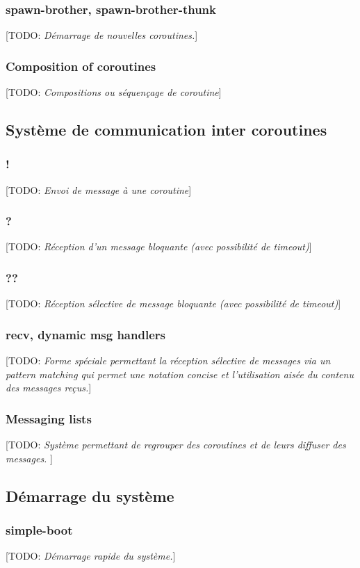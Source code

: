 \documentclass[12pt,oneside,letterpaper,francais]{book}
\newcommand{\todo}[1]{[TODO: {\it #1}]}
\begin{document}
\subsubsection{spawn-brother, spawn-brother-thunk}
\todo{Démarrage de nouvelles coroutines.}

\subsubsection{Composition of coroutines}
\todo{Compositions ou séquençage de coroutine}

\subsection{Système de communication inter coroutines}
\subsubsection{!} 
\todo{Envoi de message à une coroutine}

\subsubsection{?}
\todo{Réception d'un message bloquante (avec possibilité de timeout)}

\subsubsection{??}
\todo{Réception sélective de message bloquante (avec possibilité de timeout)}

\subsubsection{recv, dynamic msg handlers}
\todo{Forme spéciale permettant la réception sélective de messages via
  un \og pattern matching \fg qui permet une notation concise et
  l'utilisation aisée du contenu des messages reçus.}

\subsubsection{Messaging lists}
\todo{Système permettant de regrouper des coroutines et de leurs
  diffuser des messages. }

\subsection{Démarrage du système}
\subsubsection{simple-boot}
\todo{Démarrage rapide du système.}
\end{document}
